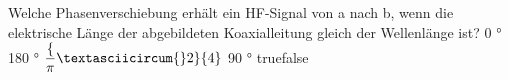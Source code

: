     {Welche Phasenverschiebung erhält ein HF-Signal von a nach b, wenn die elektrische Länge der abgebildeten Koaxialleitung gleich der Wellenlänge ist?  }
    {0 °}
    {180 °}
    {$\dfrac\{\pi\textasciicircum{}2\}\{4\}$}
    {90 °}
    {true}{false}
